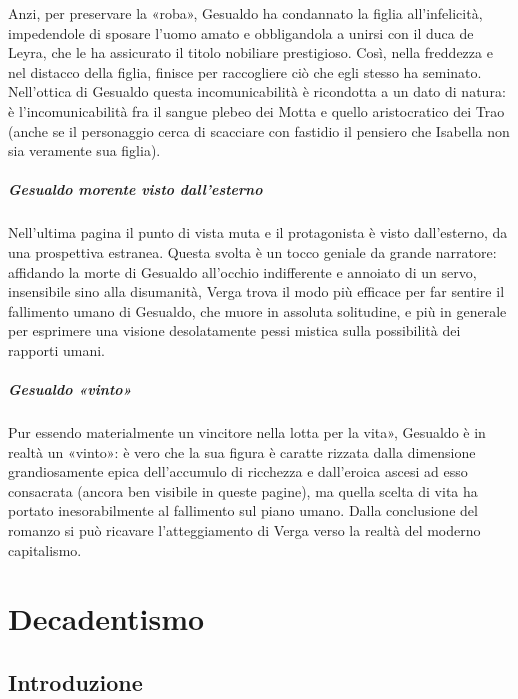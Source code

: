 \documentclass{book}
\newcounter{mar}
\begin{document}
Anzi, per preservare la «roba», Gesualdo ha condannato la figlia all'infelicità, impedendole di sposare l'uomo amato e obbligandola a unirsi con il duca de Leyra, che le ha assicurato il titolo nobiliare prestigioso. Così, nella freddezza e nel distacco della figlia, finisce per raccogliere ciò che egli stesso ha seminato. Nell'ottica di Gesualdo questa incomunicabilità è ricondotta a un dato di natura: è l'incomunicabilità fra il sangue plebeo dei Motta e quello aristocratico dei Trao (anche se il personaggio cerca di scacciare con fastidio il pensiero che Isabella non sia veramente sua figlia).

\paragraph{Gesualdo morente visto dall'esterno}

Nell'ultima pagina il punto di vista muta e il protagonista è visto dall'esterno, da una prospettiva estranea. Questa svolta è un tocco geniale da grande narratore: affidando la morte di Gesualdo all'occhio indifferente e annoiato di un servo, insensibile sino alla disumanità, Verga trova il modo più efficace per far sentire il fallimento umano di Gesualdo, che muore in assoluta solitudine, e più in generale per esprimere una visione desolatamente pessi mistica sulla possibilità dei rapporti umani.

\paragraph{Gesualdo «vinto»}

Pur essendo materialmente un vincitore nella lotta per la vita», Gesualdo è in realtà un «vinto»: è vero che la sua figura è caratte rizzata dalla dimensione grandiosamente epica dell'accumulo di ricchezza e dall'eroica ascesi ad esso consacrata (ancora ben visibile in queste pagine), ma quella scelta di vita ha portato inesorabilmente al fallimento sul piano umano. Dalla conclusione del romanzo si può ricavare l'atteggiamento di Verga verso la realtà del moderno capitalismo.


\chapter{Decadentismo}

\section{Introduzione}
\end{document}
